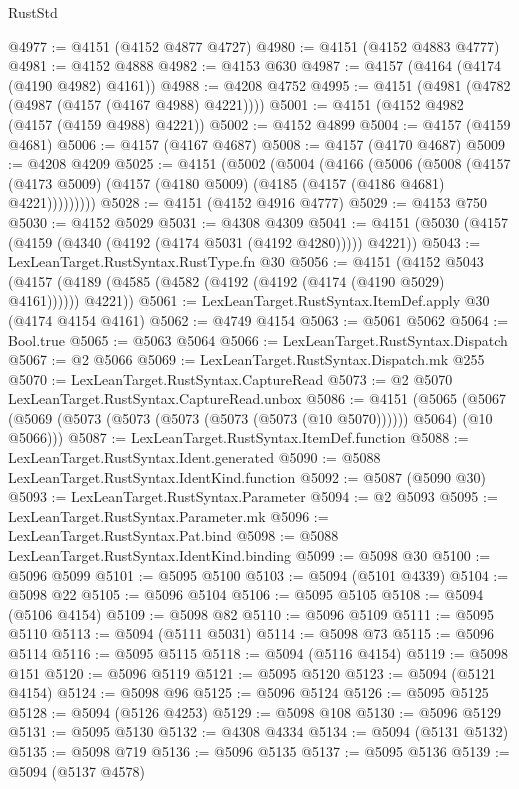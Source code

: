 \begin{lexlean}{RustStd}
\begin{coremodule}
@4977 := @4151 (@4152 @4877 @4727)
@4980 := @4151 (@4152 @4883 @4777)
@4981 := @4152 @4888
@4982 := @4153 @630
@4987 := @4157 (@4164 (@4174 (@4190 @4982) @4161))
@4988 := @4208 @4752
@4995 := @4151 (@4981 (@4782 (@4987 (@4157 (@4167 @4988) @4221))))
@5001 := @4151 (@4152 @4982 (@4157 (@4159 @4988) @4221))
@5002 := @4152 @4899
@5004 := @4157 (@4159 @4681)
@5006 := @4157 (@4167 @4687)
@5008 := @4157 (@4170 @4687)
@5009 := @4208 @4209
@5025 := @4151
    (@5002
      (@5004
        (@4166
          (@5006
            (@5008
              (@4157 (@4173 @5009) (@4157 (@4180 @5009) (@4185 (@4157 (@4186 @4681) @4221)))))))))
@5028 := @4151 (@4152 @4916 @4777)
@5029 := @4153 @750
@5030 := @4152 @5029
@5031 := @4308 @4309
@5041 := @4151 (@5030 (@4157 (@4159 (@4340 (@4192 (@4174 @5031 (@4192 @4280))))) @4221))
@5043 := LexLeanTarget.RustSyntax.RustType.fn @30
@5056 := @4151
    (@4152 @5043 (@4157 (@4189 (@4585 (@4582 (@4192 (@4192 (@4174 (@4190 @5029) @4161)))))) @4221))
@5061 := LexLeanTarget.RustSyntax.ItemDef.apply @30 (@4174 @4154 @4161)
@5062 := @4749 @4154
@5063 := @5061 @5062
@5064 := Bool.true
@5065 := @5063 @5064
@5066 := LexLeanTarget.RustSyntax.Dispatch
@5067 := @2 @5066
@5069 := LexLeanTarget.RustSyntax.Dispatch.mk @255
@5070 := LexLeanTarget.RustSyntax.CaptureRead
@5073 := @2 @5070 LexLeanTarget.RustSyntax.CaptureRead.unbox
@5086 := @4151
    (@5065 (@5067 (@5069 (@5073 (@5073 (@5073 (@5073 (@5073 (@10 @5070)))))) @5064) (@10 @5066)))
@5087 := LexLeanTarget.RustSyntax.ItemDef.function
@5088 := LexLeanTarget.RustSyntax.Ident.generated
@5090 := @5088 LexLeanTarget.RustSyntax.IdentKind.function
@5092 := @5087 (@5090 @30)
@5093 := LexLeanTarget.RustSyntax.Parameter
@5094 := @2 @5093
@5095 := LexLeanTarget.RustSyntax.Parameter.mk
@5096 := LexLeanTarget.RustSyntax.Pat.bind
@5098 := @5088 LexLeanTarget.RustSyntax.IdentKind.binding
@5099 := @5098 @30
@5100 := @5096 @5099
@5101 := @5095 @5100
@5103 := @5094 (@5101 @4339)
@5104 := @5098 @22
@5105 := @5096 @5104
@5106 := @5095 @5105
@5108 := @5094 (@5106 @4154)
@5109 := @5098 @82
@5110 := @5096 @5109
@5111 := @5095 @5110
@5113 := @5094 (@5111 @5031)
@5114 := @5098 @73
@5115 := @5096 @5114
@5116 := @5095 @5115
@5118 := @5094 (@5116 @4154)
@5119 := @5098 @151
@5120 := @5096 @5119
@5121 := @5095 @5120
@5123 := @5094 (@5121 @4154)
@5124 := @5098 @96
@5125 := @5096 @5124
@5126 := @5095 @5125
@5128 := @5094 (@5126 @4253)
@5129 := @5098 @108
@5130 := @5096 @5129
@5131 := @5095 @5130
@5132 := @4308 @4334
@5134 := @5094 (@5131 @5132)
@5135 := @5098 @719
@5136 := @5096 @5135
@5137 := @5095 @5136
@5139 := @5094 (@5137 @4578)

\end{coremodule}
\end{lexlean}
